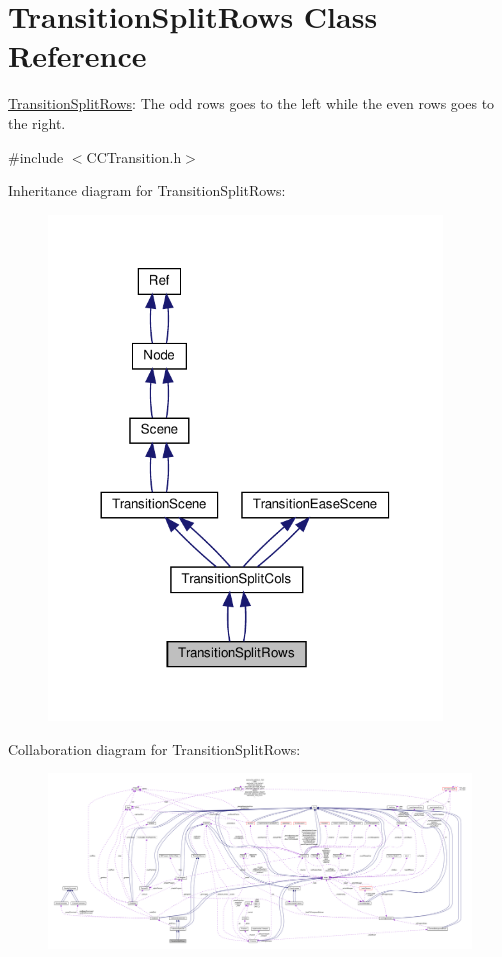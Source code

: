 \hypertarget{classTransitionSplitRows}{}\section{Transition\+Split\+Rows Class Reference}
\label{classTransitionSplitRows}


\hyperlink{classTransitionSplitRows}{Transition\+Split\+Rows}\+: The odd rows goes to the left while the even rows goes to the right.  




{\ttfamily \#include $<$C\+C\+Transition.\+h$>$}



Inheritance diagram for Transition\+Split\+Rows\+:
\nopagebreak
\begin{figure}[H]
\begin{center}
\leavevmode
\includegraphics[width=296pt]{classTransitionSplitRows__inherit__graph}
\end{center}
\end{figure}


Collaboration diagram for Transition\+Split\+Rows\+:
\nopagebreak
\begin{figure}[H]
\begin{center}
\leavevmode
\includegraphics[width=350pt]{classTransitionSplitRows__coll__graph}
\end{center}
\end{figure}
